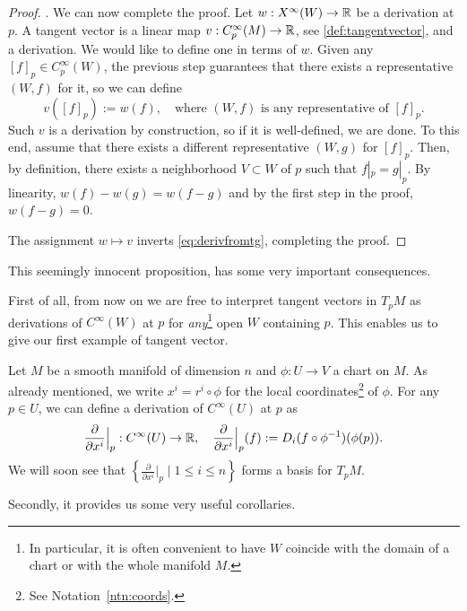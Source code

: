 \begin{proof}
    . We can now complete the proof.
    Let $w:X^\infty(W) \to\mathbb{R}$ be a derivation at $p$.
    A tangent vector is a linear map $v:C_p^\infty(M)\to\mathbb{R}$, see \eqref{def:tangentvector}, and a derivation.
    We would like to define one in terms of $w$.
    Given any $[f]_p\in C_p^\infty(W)$, the previous step guarantees that there exists a representative $(W,f)$ for it, so we can define
    \begin{equation}
        v([f]_p) := w(f), \quad\mbox{where $(W,f)$ is any representative of $[f]_p$}.
    \end{equation}
    Such $v$ is a derivation by construction, so if it is well-defined, we are done.
    To this end, assume that there exists a different representative $(W, g)$ for $[f]_p$.
    Then, by definition, there exists a neighborhood $V\subset W$ of $p$ such that $f|_p = g|_p$.
    By linearity, $w(f) - w(g) = w(f-g)$ and by the first step in the proof, $w(f-g) = 0$.
    
    The assignment $w\mapsto v$ inverts \eqref{eq:derivfromtg}, completing the proof.
\end{proof}

This seemingly innocent proposition, has some very important consequences.

First of all, from now on we are free to interpret tangent vectors in $T_p M$ as derivations of $C^\infty(W)$ at $p$ for \emph{any}\footnote{In particular, it is often convenient to have $W$ coincide with the domain of a chart or with the whole manifold $M$.} open $W$ containing $p$.
This enables us to give our first example of tangent vector.

\begin{ex}\label{ex:partialderivative}
    Let $M$ be a smooth manifold of dimension $n$ and $\phi: U \to V$ a chart on $M$.
    As already mentioned, we write $x^i = r^i \circ \phi$ for the local coordinates\footnote{See Notation~\ref{ntn:coords}.} of $\phi$.
    For any $p\in U$, we can define a derivation of $C^\infty(U)$ at $p$ as
    \begin{equation}
        \frac{\partial}{\partial x^i}\Big|_p : C^\infty(U) \to \mathbb{R}, \quad
        \frac{\partial}{\partial x^i}\Big|_p (f) := D_i(f\circ\phi^{-1})(\phi(p)).
    \end{equation}
    We will soon see that $\left\{\frac{\partial}{\partial x^i}\Big|_p \mid 1\leq i\leq n\right\}$ forms a basis for $T_p M$.
\end{ex}

Secondly, it provides us some very useful corollaries.

